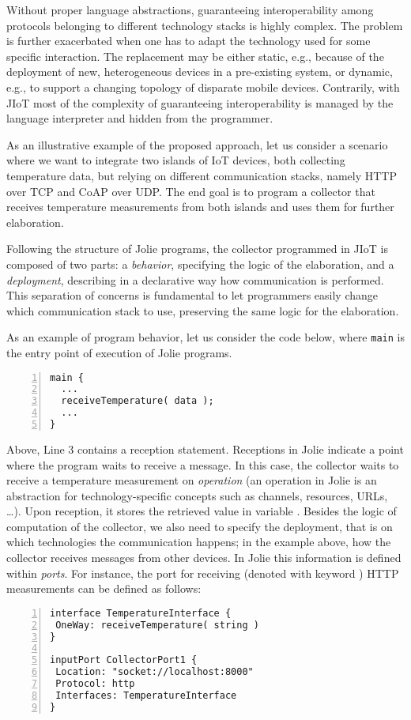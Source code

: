 Without proper language abstractions, guaranteeing interoperability among
protocols belonging to different technology stacks is highly complex. The problem is
further exacerbated when one has to adapt the technology used for some specific
interaction. The replacement may be either static, e.g., because of the
deployment of new, heterogeneous devices in a pre-existing system, or dynamic,
e.g., to support a changing topology of disparate mobile devices. Contrarily,
with JIoT most of the complexity of guaranteeing interoperability is managed by
the language interpreter and hidden from the programmer.

As an illustrative example of the proposed approach, let us consider a scenario
where we want to integrate two islands of IoT devices, both collecting
temperature data, but relying on different communication stacks, namely HTTP
over TCP and CoAP over UDP.
%
The end goal is to program a collector that receives temperature measurements
from both islands and uses them for further elaboration.

Following the structure of Jolie programs, the collector programmed in JIoT is
composed of two parts: a \emph{behavior}, specifying the logic of the
elaboration, and a \emph{deployment}, describing in a declarative way how
communication is performed. This separation of concerns is fundamental to let
programmers easily change which communication stack to use, preserving the same
logic for the elaboration.

As an example of program behavior, let us consider the code below, where \lstinline{main} is the entry point of execution of Jolie programs.
%
\begin{lstlisting}[numbers=left,basicstyle=\footnotesize\ttfamily]
main {
  ...
  receiveTemperature( data );
  ...
}
\end{lstlisting}
%
Above, Line 3 contains a reception statement.
Receptions in Jolie indicate a
point where the program waits to receive a message.
In this case, the collector
waits to receive a temperature measurement on \emph{operation}
 (an operation in Jolie is an abstraction for
technology-specific concepts such as channels, resources, URLs,
\dots). Upon reception, it stores the retrieved value in variable .
%
Besides the logic of computation of the collector, we also need to specify the deployment, that is on
which technologies the communication happens; in the example above, how the
collector receives messages from other devices. In Jolie this information is
defined within \emph{ports}. For instance, the port for receiving (denoted with
keyword ) HTTP measurements can be defined as follows:
%
\newline
\begin{lstlisting}[numbers=left,basicstyle=\ttfamily\footnotesize,caption=Example of interface
and input port in Jolie.]
interface TemperatureInterface {
 OneWay: receiveTemperature( string )
}

inputPort CollectorPort1 {
 Location: "socket://localhost:8000"
 Protocol: http
 Interfaces: TemperatureInterface
}
\end{lstlisting}

